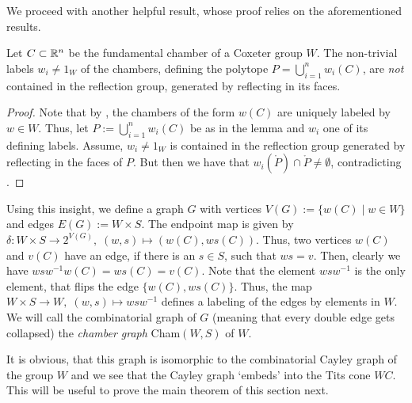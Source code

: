 We proceed with another helpful result, whose proof relies on the aforementioned results.

\begin{lemma}
    Let \(C \subset \mathbb{R}^n\) be the fundamental chamber of a Coxeter group \(W\).
    The non-trivial labels \(w_i \neq 1_W\) of the chambers, defining the polytope \(P = \bigcup_{i=1}^n w_i(C)\), are \emph{not} contained in the reflection group, generated by reflecting in its faces.
\end{lemma}
\begin{proof}
    Note that by , the chambers of the form \(w(C)\) are uniquely labeled by \(w \in W\).
    Thus, let \(P := \bigcup_{i = 1}^n w_i(C)\) be as in the lemma and \(w_i\) one of its defining labels.
    Assume, \(w_i \neq 1_W\) is contained in the reflection group generated by reflecting in the faces of \(P\).
    But then we have that \(w_i(\mathring{P}) \cap \mathring{P} \neq \emptyset\), contradicting .
\end{proof}

Using this insight, we define a graph \(G\) with vertices \(V(G) := \{w(C) \;\vert\; w \in W\}\) and edges \(E(G) := W \times S\).
The endpoint map is given by \(\delta : W \times S \to 2^{V(G)},\; (w, s) \mapsto (w(C), ws(C))\).
Thus, two vertices \(w(C)\) and \(v(C)\) have an edge, if there is an \(s \in S\), such that \(ws = v\).
Then, clearly we have \(wsw^{-1}w(C) = ws(C) = v(C)\).
Note that the element \(wsw^{-1}\) is the only element, that flips the edge \(\{w(C), ws(C)\}\).
Thus, the map \(W \times S \to W, \; (w, s) \mapsto wsw^{-1}\) defines a labeling of the edges by elements in \(W\).
We will call the combinatorial graph of \(G\) (meaning that every double edge gets collapsed) the \emph{chamber graph} Cham\((W, S)\) of \(W\).

It is obvious, that this graph is isomorphic to the combinatorial Cayley graph of the group \(W\) and we see that the Cayley graph `embeds' into the Tits cone \(WC\).
This will be useful to prove the main theorem of this section next.

